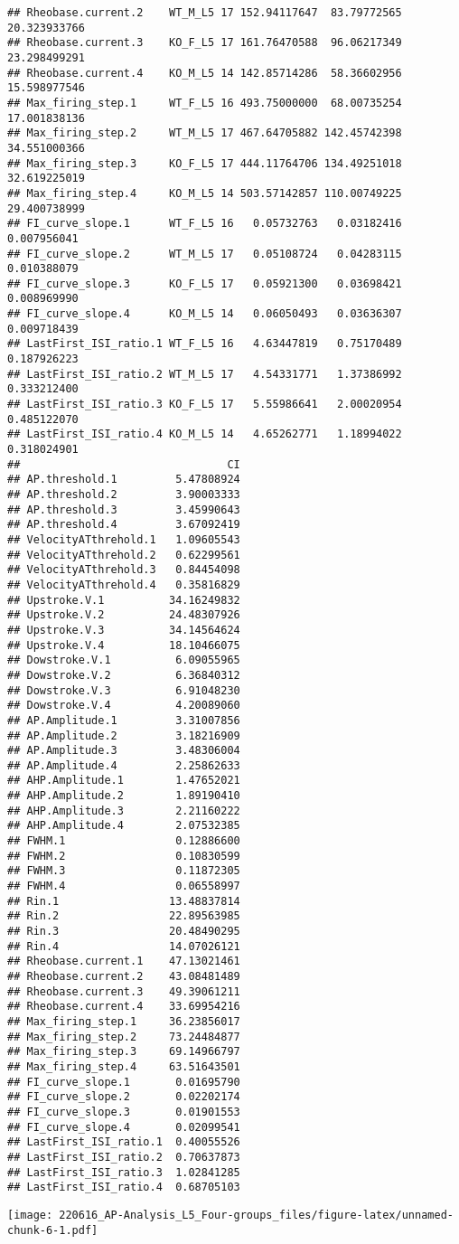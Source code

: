 \documentclass[
]{article}
\begin{document}
\begin{verbatim}
## Rheobase.current.2    WT_M_L5 17 152.94117647  83.79772565 20.323933766
## Rheobase.current.3    KO_F_L5 17 161.76470588  96.06217349 23.298499291
## Rheobase.current.4    KO_M_L5 14 142.85714286  58.36602956 15.598977546
## Max_firing_step.1     WT_F_L5 16 493.75000000  68.00735254 17.001838136
## Max_firing_step.2     WT_M_L5 17 467.64705882 142.45742398 34.551000366
## Max_firing_step.3     KO_F_L5 17 444.11764706 134.49251018 32.619225019
## Max_firing_step.4     KO_M_L5 14 503.57142857 110.00749225 29.400738999
## FI_curve_slope.1      WT_F_L5 16   0.05732763   0.03182416  0.007956041
## FI_curve_slope.2      WT_M_L5 17   0.05108724   0.04283115  0.010388079
## FI_curve_slope.3      KO_F_L5 17   0.05921300   0.03698421  0.008969990
## FI_curve_slope.4      KO_M_L5 14   0.06050493   0.03636307  0.009718439
## LastFirst_ISI_ratio.1 WT_F_L5 16   4.63447819   0.75170489  0.187926223
## LastFirst_ISI_ratio.2 WT_M_L5 17   4.54331771   1.37386992  0.333212400
## LastFirst_ISI_ratio.3 KO_F_L5 17   5.55986641   2.00020954  0.485122070
## LastFirst_ISI_ratio.4 KO_M_L5 14   4.65262771   1.18994022  0.318024901
##                                CI
## AP.threshold.1         5.47808924
## AP.threshold.2         3.90003333
## AP.threshold.3         3.45990643
## AP.threshold.4         3.67092419
## VelocityATthrehold.1   1.09605543
## VelocityATthrehold.2   0.62299561
## VelocityATthrehold.3   0.84454098
## VelocityATthrehold.4   0.35816829
## Upstroke.V.1          34.16249832
## Upstroke.V.2          24.48307926
## Upstroke.V.3          34.14564624
## Upstroke.V.4          18.10466075
## Dowstroke.V.1          6.09055965
## Dowstroke.V.2          6.36840312
## Dowstroke.V.3          6.91048230
## Dowstroke.V.4          4.20089060
## AP.Amplitude.1         3.31007856
## AP.Amplitude.2         3.18216909
## AP.Amplitude.3         3.48306004
## AP.Amplitude.4         2.25862633
## AHP.Amplitude.1        1.47652021
## AHP.Amplitude.2        1.89190410
## AHP.Amplitude.3        2.21160222
## AHP.Amplitude.4        2.07532385
## FWHM.1                 0.12886600
## FWHM.2                 0.10830599
## FWHM.3                 0.11872305
## FWHM.4                 0.06558997
## Rin.1                 13.48837814
## Rin.2                 22.89563985
## Rin.3                 20.48490295
## Rin.4                 14.07026121
## Rheobase.current.1    47.13021461
## Rheobase.current.2    43.08481489
## Rheobase.current.3    49.39061211
## Rheobase.current.4    33.69954216
## Max_firing_step.1     36.23856017
## Max_firing_step.2     73.24484877
## Max_firing_step.3     69.14966797
## Max_firing_step.4     63.51643501
## FI_curve_slope.1       0.01695790
## FI_curve_slope.2       0.02202174
## FI_curve_slope.3       0.01901553
## FI_curve_slope.4       0.02099541
## LastFirst_ISI_ratio.1  0.40055526
## LastFirst_ISI_ratio.2  0.70637873
## LastFirst_ISI_ratio.3  1.02841285
## LastFirst_ISI_ratio.4  0.68705103
\end{verbatim}

\texttt{[image: 220616\_AP-Analysis\_L5\_Four-groups\_files/figure-latex/unnamed-chunk-6-1.pdf]}
\end{document}
